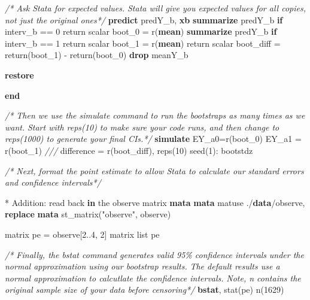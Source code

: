 \documentclass[
  10pt,
]{book}
\newenvironment{Shaded}{\begin{snugshade}}{\end{snugshade}}
\newcommand{\CommentTok}[1]{\textcolor[rgb]{0.56,0.35,0.01}{\textit{#1}}}
\newcommand{\DecValTok}[1]{\textcolor[rgb]{0.00,0.00,0.81}{#1}}
\newcommand{\FunctionTok}[1]{\textcolor[rgb]{0.00,0.00,0.00}{#1}}
\newcommand{\KeywordTok}[1]{\textcolor[rgb]{0.13,0.29,0.53}{\textbf{#1}}}
\newcommand{\NormalTok}[1]{#1}
\newcommand{\OtherTok}[1]{\textcolor[rgb]{0.56,0.35,0.01}{#1}}
\newcommand{\StringTok}[1]{\textcolor[rgb]{0.31,0.60,0.02}{#1}}
\begin{document}
\begin{Shaded}
\begin{Highlighting}[]
\CommentTok{/* Ask Stata for expected values.}
\CommentTok{Stata will give you expected values for all copies, not just the}
\CommentTok{original ones*/}
\KeywordTok{predict}\NormalTok{ predY\_b, }\KeywordTok{xb}
\KeywordTok{summarize}\NormalTok{ predY\_b }\KeywordTok{if}\NormalTok{ interv\_b == 0}
\FunctionTok{return} \FunctionTok{scalar}\NormalTok{ boot\_0 = }\FunctionTok{r}\NormalTok{(}\KeywordTok{mean}\NormalTok{)}
\KeywordTok{summarize}\NormalTok{ predY\_b }\KeywordTok{if}\NormalTok{ interv\_b == 1}
\FunctionTok{return} \FunctionTok{scalar}\NormalTok{ boot\_1 = }\FunctionTok{r}\NormalTok{(}\KeywordTok{mean}\NormalTok{)}
\FunctionTok{return} \FunctionTok{scalar}\NormalTok{ boot\_diff = }\FunctionTok{return}\NormalTok{(boot\_1) {-} }\FunctionTok{return}\NormalTok{(boot\_0)}
\KeywordTok{drop}\NormalTok{ meanY\_b}

\KeywordTok{restore}

\KeywordTok{end}

\CommentTok{/* Then we use the \textasciigrave{}simulate\textasciigrave{} command to run the bootstraps as many}
\CommentTok{times as we want.}
\CommentTok{Start with reps(10) to make sure your code runs, and then change to}
\CommentTok{reps(1000) to generate your final CIs.*/}
\KeywordTok{simulate}\NormalTok{ EY\_a0=}\FunctionTok{r}\NormalTok{(boot\_0) EY\_a1 = }\FunctionTok{r}\NormalTok{(boot\_1) }\CommentTok{///}
\NormalTok{  difference = }\FunctionTok{r}\NormalTok{(boot\_diff), reps(10) }\DecValTok{seed}\NormalTok{(1): bootstdz}

\CommentTok{/* Next, format the point estimate to allow Stata to calculate our}
\CommentTok{standard errors and confidence intervals*/}
  
\NormalTok{* Addition: read back }\KeywordTok{in}\NormalTok{ the observe }\FunctionTok{matrix}  
\KeywordTok{mata} \KeywordTok{mata}\NormalTok{ matuse ./}\KeywordTok{data}\NormalTok{/observe, }\KeywordTok{replace}
\KeywordTok{mata}\NormalTok{ st\_matrix(}\StringTok{"observe"}\NormalTok{, observe)}

\FunctionTok{matrix}\NormalTok{ pe = observe[2..4, 2]\textquotesingle{}}
\FunctionTok{matrix} \OtherTok{list}\NormalTok{ pe}

\CommentTok{/* Finally, the bstat command generates valid 95\% confidence intervals}
\CommentTok{under the normal approximation using our bootstrap results.}
\CommentTok{The default results use a normal approximation to calcutlate the}
\CommentTok{confidence intervals.}
\CommentTok{Note, n contains the original sample size of your data before censoring*/}
\KeywordTok{bstat}\NormalTok{, stat(pe) n(1629) }
\end{Highlighting}
\end{Shaded}
\end{document}
